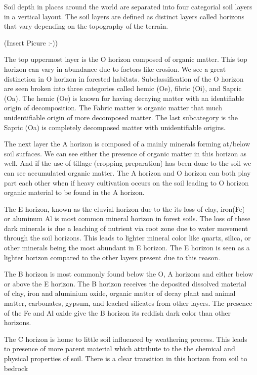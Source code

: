 Soil depth in places around the world are separated into four categorial soil layers in a vertical layout. The soil layers are defined as distinct layers called horizons that vary depending on the topography of the terrain.

(Insert Picure :-))

The top uppermost layer is the O horizon composed of organic matter. This top horizon can vary in abundance due to factors like erosion.  We see a great distinction in O horizon in forested habitats. Subclassification of the O horizon are seen broken into three categories called hemic (Oe), fibric (Oi), and Sapric (Oa). The hemic (Oe) is known for having decaying matter with an identifiable origin of decomposition. The Fabric matter is organic matter that much unidentifiable origin of more decomposed matter. The last subcategory is the Sapric (Oa) is completely decomposed matter with unidentifiable origins. 

The next layer the A horizon is composed of a mainly minerals forming at/below soil surfaces. We can see either the presence of organic matter in this horizon as well. And if the use of tillage (cropping preparation) has been done to the soil we can see accumulated organic matter. The A horizon and O horizon can both play part each other when if heavy cultivation occurs on the soil leading to O horizon organic material to be found in the A horizon. 

The E horizon, known as the eluvial horizon due to the its loss of clay, iron(Fe) or aluminum Al is most common mineral horizon in forest soils. The loss of these dark minerals is due a leaching of nutrient via root zone due to water movement through the soil horizons. This leads to lighter mineral color like quartz, silica, or other minerals being the most abundant in E horizon. The E horizon is seen as a lighter horizon compared to the other layers present due to this reason.

The B horizon is most commonly found below the O, A horizons and either below or above the E horizon. The B horizon receives the deposited dissolved material of clay, iron and aluminium oxide, organic matter of decay plant and animal matter, carbonates, gypsum, and leached silicates from other layers. The presence of the Fe and Al oxide give the B horizon its reddish dark color than other horizons. 

The C horizon is home to little soil influenced by weathering process. This leads to presence of more parent material which attribute to the the chemical and physical properties of soil. There is a clear transition in this horizon from soil to bedrock

